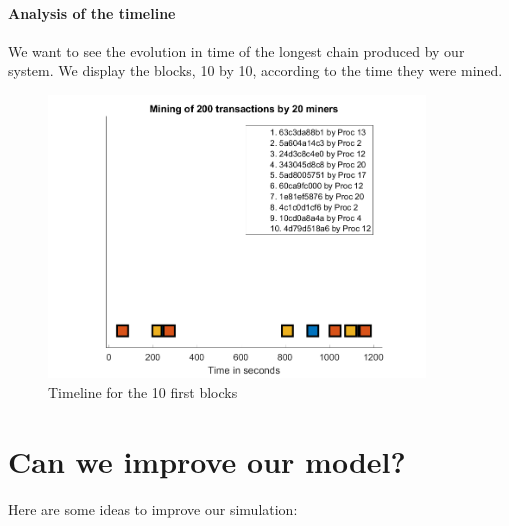 \paragraph{Analysis of the timeline}

We want to see the evolution in time of the longest chain produced by our system. We display the blocks, 10 by 10, according to the time they were mined.

\begin{figure}[ht]
\centering
\includegraphics[width=10cm]{Figures/timeline_1}
\caption{Timeline for the 10 first blocks}
\end{figure}
\medskip


\section{Can we improve our model?} \label{improvements}

Here are some ideas to improve our simulation: \newline

